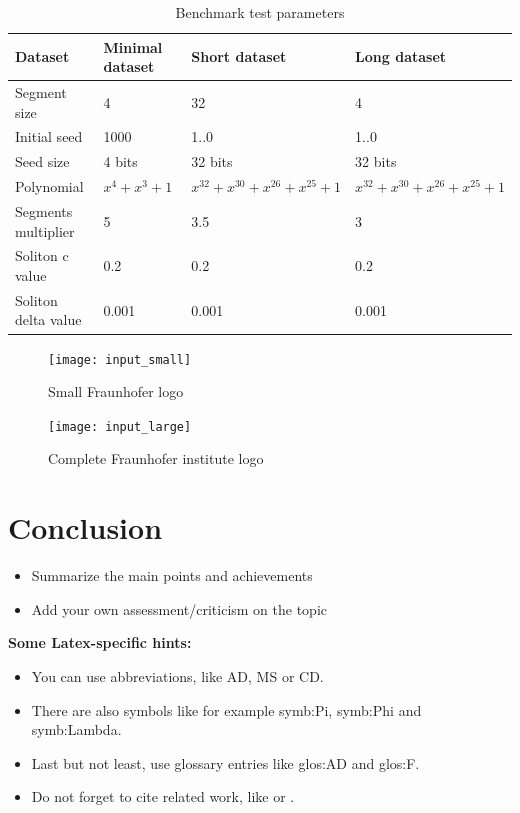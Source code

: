 \documentclass[12pt]%
{article}
\begin{document}
\begin{table}[ht]
    \centering
    \small
    \begin{tabularx}{\textwidth}{|X|X|X|X|}
        \hline
        Dataset & Minimal dataset & Short dataset & Long dataset \\
        \hline
        Segment size & 4 & 32 & 4 \\
        \hline
        Initial seed & 1000 & 1..0 & 1..0 \\
        \hline
        Seed size & 4 bits & 32 bits & 32 bits \\
        \hline
        Polynomial & \(x^{4} + x^{3} + 1 \) & \(x^{32} + x^{30} + x^{26} + x^{25} + 1\) & \(x^{32} + x^{30} + x^{26} + x^{25} + 1\) \\
        \hline
        Segments multiplier & 5 & 3.5 & 3 \\
        \hline
        Soliton c value & 0.2 & 0.2 & 0.2 \\
        \hline
        Soliton delta value & 0.001 & 0.001 & 0.001 \\
        \hline
    \end{tabularx}
    \caption{Benchmark test parameters}
    \label{tab:benchmark-parameters}
\end{table}


\begin{figure}[h]
    \centering
    \texttt{[image: input\_small]}
    \caption{Small Fraunhofer logo}
    \label{fig:logo_short}
\end{figure}


\begin{figure}[h]
    \centering
    \texttt{[image: input\_large]}
    \caption{Complete Fraunhofer institute logo}
    \label{fig:logo_long}
\end{figure}

\section{Conclusion}

\begin{itemize}
\item Summarize the main points and achievements
\item Add your own assessment/criticism on the topic
\end{itemize}


\textbf{Some Latex-specific hints:}


\begin{itemize}
\item You can use abbreviations, like \gls{AD}, \gls{MS} or \gls{CD}.
\item There are also symbols like for example \gls{symb:Pi}, \gls{symb:Phi} and \gls{symb:Lambda}.
\item Last but not least, use glossary entries like \gls{glos:AD} and \gls{glos:F}.
\item Do not forget to cite related work, like \cite{okman2011security} or \cite{borthakur2011apache}.
\end{itemize}
\newpage

\printglossary[style=altlist,title=Glossary]
 
\printglossary[type=\acronymtype,style=long]
 
\printglossary[type=symbolslist,style=long]

\newpage



\end{document}
